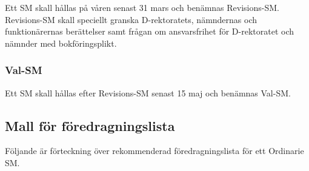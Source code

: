 \documentclass[a4paper,12pt]{article}
\begin{document}
Ett SM skall hållas på våren senast 31 mars och benämnas Revisions-SM. Revisions-SM skall speciellt granska D-rektoratets, nämndernas och funktionärernas berättelser samt frågan om ansvarsfrihet för D-rektoratet och nämnder med bokföringsplikt.

\subsubsection{Val-SM}

Ett SM skall hållas efter Revisions-SM senast 15 maj och benämnas Val-SM.

\subsection{Mall för föredragningslista}

Följande är förteckning över rekommenderad föredragningslista för ett Ordinarie SM.
\end{document}
